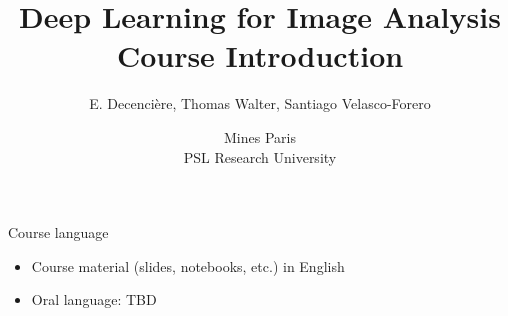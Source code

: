 \documentclass[xcolor=pdftex,dvipsnames,table,mathserif]{beamer}
\title{Deep Learning for Image Analysis\\Course Introduction}
\author{E. Decencière, Thomas Walter, Santiago Velasco-Forero}
\date{Mines Paris\\
  PSL Research University
}
\begin{document}
\begin{frame}
\titlepage
\end{frame}

\begin{frame}{Course language}

\begin{itemize}
\item Course material (slides, notebooks, etc.) in English
\item Oral language: TBD
\end{itemize}

\end{frame}



\end{document}
